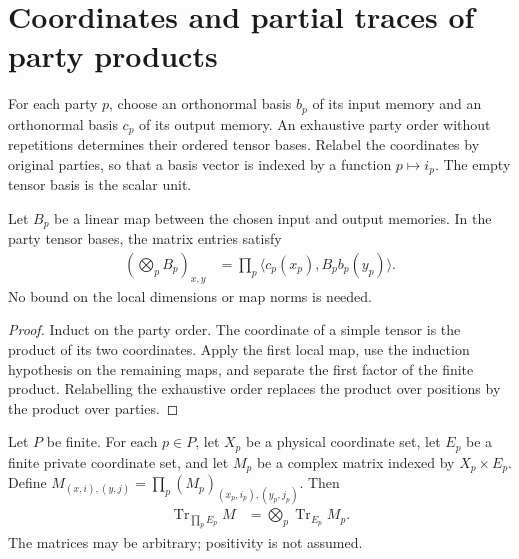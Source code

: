 \section{Coordinates and partial traces of party products}
\label{sec:peps_party_matrix_coordinates}

\begin{definition}
    \label{def:peps_party_tensor_basis}
    \leanok
    For each party $p$, choose an orthonormal basis $b_p$ of its input
    memory and an orthonormal basis $c_p$ of its output memory. An
    exhaustive party order without repetitions determines their ordered
    tensor bases. Relabel the coordinates by original parties, so that
    a basis vector is indexed by a function $p\mapsto i_p$.
    The empty tensor basis is the scalar unit.
\end{definition}

\begin{theorem}
    \label{thm:peps_party_tensor_entries}
    \leanok
    Let $B_p$ be a linear map between the chosen input and output
    memories. In the party tensor bases, the matrix entries satisfy
    \begin{align}
        \left(\bigotimes_p B_p\right)_{x,y}
        &=\prod_p\langle c_p(x_p),B_pb_p(y_p)\rangle.
        \label{eq:peps_party_tensor_entries}
    \end{align}
    No bound on the local dimensions or map norms is needed.
\end{theorem}

\begin{proof}\leanok
    Induct on the party order. The coordinate of a simple tensor is
    the product of its two coordinates. Apply the first local map,
    use the induction hypothesis on the remaining maps, and separate
    the first factor of the finite product. Relabelling the exhaustive
    order replaces the product over positions by the product over parties.
\end{proof}

\begin{theorem}
    \label{thm:peps_party_product_trace}
    \leanok
    Let $P$ be finite. For each $p\in P$, let $X_p$ be a physical
    coordinate set, let $E_p$ be a finite private coordinate set, and
    let $M_p$ be a complex matrix indexed by $X_p\times E_p$.
    Define $M_{(x,i),(y,j)}=\prod_p(M_p)_{(x_p,i_p),(y_p,j_p)}$.
    Then
    \begin{align}
        \operatorname{Tr}_{\prod_p E_p}M
        &=\bigotimes_p\operatorname{Tr}_{E_p}M_p.
        \label{eq:peps_party_product_trace}
    \end{align}
    The matrices may be arbitrary; positivity is not assumed.
\end{theorem}

